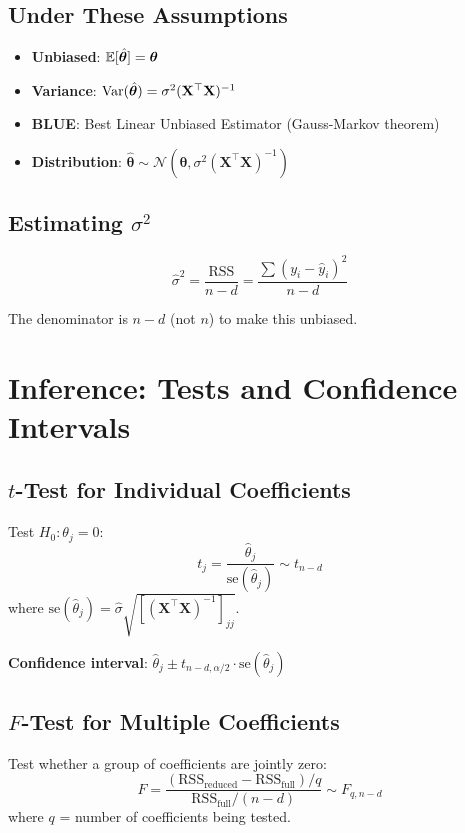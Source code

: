 \documentclass[main.tex]{subfiles}
\begin{document}
\subsection{Under These Assumptions}

\begin{itemize}
    \item \textbf{Unbiased}: $\mathbb{E}[\hat{\boldsymbol{\theta}}] = \boldsymbol{\theta}$
    \item \textbf{Variance}: $\text{Var}(\hat{\boldsymbol{\theta}}) = \sigma^2 (\mathbf{X}^\top\mathbf{X})^{-1}$
    \item \textbf{BLUE}: Best Linear Unbiased Estimator (Gauss-Markov theorem)
    \item \textbf{Distribution}: $\hat{\boldsymbol{\theta}} \sim \mathcal{N}(\boldsymbol{\theta}, \sigma^2(\mathbf{X}^\top\mathbf{X})^{-1})$
\end{itemize}

\subsection{Estimating $\sigma^2$}

$$\hat{\sigma}^2 = \frac{\text{RSS}}{n-d} = \frac{\sum(y_i - \hat{y}_i)^2}{n-d}$$

The denominator is $n-d$ (not $n$) to make this unbiased.

\section{Inference: Tests and Confidence Intervals}

\subsection{$t$-Test for Individual Coefficients}

Test $H_0: \theta_j = 0$:
$$t_j = \frac{\hat{\theta}_j}{\text{se}(\hat{\theta}_j)} \sim t_{n-d}$$
where $\text{se}(\hat{\theta}_j) = \hat{\sigma}\sqrt{[(\mathbf{X}^\top\mathbf{X})^{-1}]_{jj}}$.

\textbf{Confidence interval}: $\hat{\theta}_j \pm t_{n-d, \alpha/2} \cdot \text{se}(\hat{\theta}_j)$

\subsection{$F$-Test for Multiple Coefficients}

Test whether a group of coefficients are jointly zero:
$$F = \frac{(\text{RSS}_{\text{reduced}} - \text{RSS}_{\text{full}})/q}{\text{RSS}_{\text{full}}/(n-d)} \sim F_{q, n-d}$$
where $q$ = number of coefficients being tested.
\end{document}
